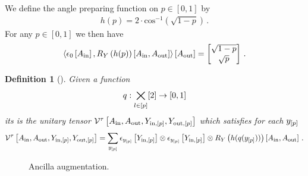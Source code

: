 \documentclass[aps,onecolumn,nofootinbib,pra]{article}
\newtheorem{definition}{Definition}
\begin{document}
    We define the angle preparing function on $p\in[0,1]$ by
    \begin{align*}
        h(p) = 2 \cdot \mathrm{cos}^{-1}\left(\sqrt{1-p}\right) \, .
    \end{align*}
    For any $p\in[0,1]$ we then have
    \begin{align*}
        \left\langle \epsilon_{0}\left[A_{\mathrm{in}}\right],R_Y\left({h(p)}\right)\left[A_{\mathrm{in}},A_{\mathrm{out}}\right]\right\rangle \left[ A_{\mathrm{out}} \right]
        = \begin{bmatrix}
              \sqrt{1-p} \\
              \sqrt{p}
        \end{bmatrix} \, .
    \end{align*}

    \begin{definition}[\ActivationCircuit{}]
        Given a function
        \begin{align*}
            q : \bigtimes_{l\in[p]} [2] \rightarrow [0,1]
        \end{align*}
        its \activationCircuit{} is the unitary tensor
        $\mathcal{V}^{\tau}\left[A_{\mathrm{in}},A_{\mathrm{out}},Y_{\mathrm{in},[p]},Y_{\mathrm{out},[p]}\right]$ which satisfies for each $y_{[p]}$
        \begin{align*}
            \mathcal{V}^{\tau}\left[A_{\mathrm{in}},A_{\mathrm{out}},Y_{\mathrm{in},[p]},Y_{\mathrm{out},[p]}\right]
            = \sum_{y_{[p]}} \epsilon_{y_{[p]}}\left[Y_{\mathrm{in},[p]}\right]
            \otimes \epsilon_{y_{[p]}}\left[Y_{\mathrm{in},[p]}\right]
            \otimes R_Y\left({h(q(y_{[p]}))}\right)\left[A_{\mathrm{in}},A_{\mathrm{out}}\right] \, .
        \end{align*}
    \end{definition}

    \begin{figure}
        \begin{center}
            
        \end{center}
        \caption{
            Ancilla augmentation.
        }
    \end{figure}
\end{document}
